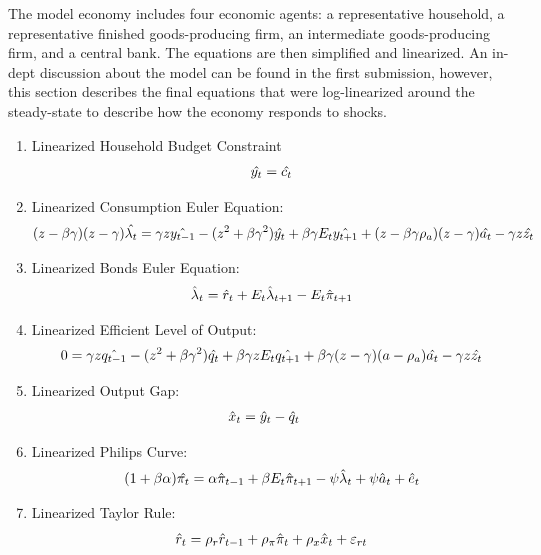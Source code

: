 \documentclass[11pt,preprint, authoryear]{elsarticle}
\numberwithin{equation}{section}
\numberwithin{figure}{section}
\numberwithin{table}{section}
\begin{document}
The model economy includes four economic agents: a representative
household, a representative finished goods-producing firm, an
intermediate goods-producing firm, and a central bank. The equations are
then simplified and linearized. An in-dept discussion about the model
can be found in the first submission, however, this section describes
the final equations that were log-linearized around the steady-state to
describe how the economy responds to shocks.

\begin{enumerate}
\def\labelenumi{\arabic{enumi}.}
\item
  Linearized Household Budget Constraint \begin{align*} \notag
  \hat{y_t} =\hat{c_t}
  \end{align*}
\item
  Linearized Consumption Euler Equation: \begin{align} \notag
  (z - \beta\gamma)(z-\gamma)\hat{\lambda_t} = \gamma z \hat{y_{t-1}} - (z^2 + \beta\gamma^2)\hat{y_t} + \beta\gamma E_t \hat{y_{t+1}} + (z -\beta\gamma\rho_a)(z-\gamma)\hat{a_t} - \gamma z\hat{z_t}
  \end{align}
\item
  Linearized Bonds Euler Equation: \begin{align*} \notag
  \hat{\lambda}_t = \hat{r}_t + E_t \hat{\lambda}_{t+1} - E_t \hat{\pi}_{t+1}
  \end{align*}
\item
  Linearized Efficient Level of Output: \begin{align} \notag
  0 = \gamma z \hat{q_{t-1}} - (z^2 + \beta\gamma^2)\hat{q_t} + \beta\gamma z E_t\hat{q_{t+1}} + \beta\gamma(z-\gamma)(a-\rho_a)\hat{a_t} - \gamma z\hat{z_t} 
  \end{align}
\item
  Linearized Output Gap: \begin{align} \notag
  \hat{x}_{t}&=\hat{y}_{t}-\hat{q}_{t} 
  \end{align}
\item
  Linearized Philips Curve: \begin{align*} \notag
  (1+\beta \alpha)\hat{\pi_t} = \alpha \hat{\pi}_{t-1} + \beta E_t \hat{\pi}_{t+1} - \psi\hat{\lambda}_t + \psi\hat{a}_t + \hat{e}_t
  \end{align*}
\item
  Linearized Taylor Rule: \begin{align} \notag
  \hat{r}_{t}= \rho_{r}\hat{r}_{t-1}  + \rho_{\pi}\hat{\pi}_{t} + \rho_{x}\hat{x}_{t} + \varepsilon_{rt} 

\end{align}
\end{enumerate}
\end{document}
